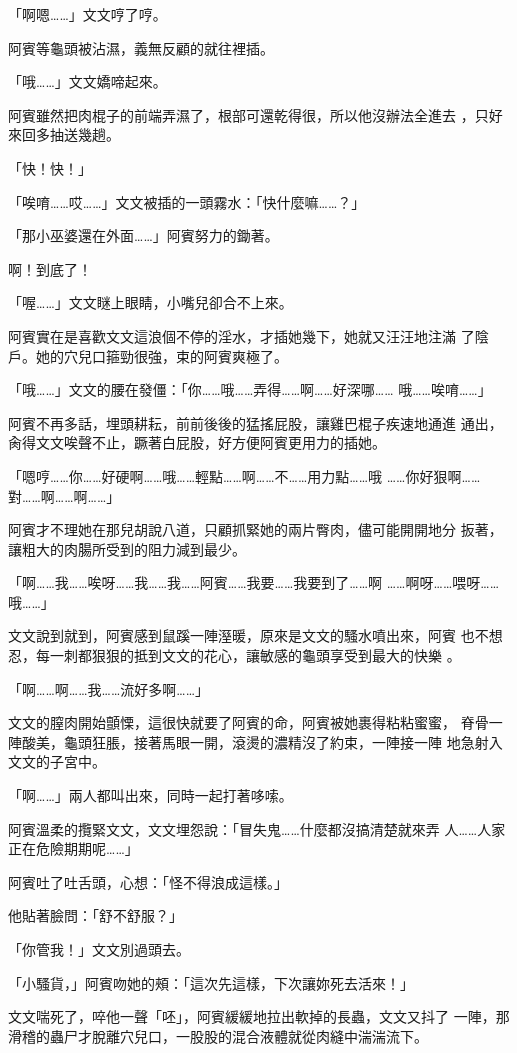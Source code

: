 「啊嗯……」文文哼了哼。

阿賓等龜頭被沾濕，義無反顧的就往裡插。

「哦……」文文嬌啼起來。

阿賓雖然把肉棍子的前端弄濕了，根部可還乾得很，所以他沒辦法全進去
，只好來回多抽送幾趟。

「快！快！」

「唉唷……哎……」文文被插的一頭霧水：「快什麼嘛……？」

「那小巫婆還在外面……」阿賓努力的鋤著。

啊！到底了！

「喔……」文文瞇上眼睛，小嘴兒卻合不上來。

阿賓實在是喜歡文文這浪個不停的淫水，才插她幾下，她就又汪汪地注滿
了陰戶。她的穴兒口箍勁很強，束的阿賓爽極了。

「哦……」文文的腰在發僵：「你……哦……弄得……啊……好深哪……
哦……唉唷……」

阿賓不再多話，埋頭耕耘，前前後後的猛搖屁股，讓雞巴棍子疾速地通進
通出，肏得文文唉聲不止，蹶著白屁股，好方便阿賓更用力的插她。

「嗯哼……你……好硬啊……哦……輕點……啊……不……用力點……哦
……你好狠啊……對……啊……啊……」

阿賓才不理她在那兒胡說八道，只顧抓緊她的兩片臀肉，儘可能開開地分
扳著，讓粗大的肉腸所受到的阻力減到最少。

「啊……我……唉呀……我……我……阿賓……我要……我要到了……啊
……啊呀……喂呀……哦……」

文文說到就到，阿賓感到鼠蹊一陣溼暖，原來是文文的騷水噴出來，阿賓
也不想忍，每一刺都狠狠的抵到文文的花心，讓敏感的龜頭享受到最大的快樂
。

「啊……啊……我……流好多啊……」

文文的膣肉開始顫慄，這很快就要了阿賓的命，阿賓被她裹得粘粘蜜蜜，
脊骨一陣酸美，龜頭狂脹，接著馬眼一開，滾燙的濃精沒了約束，一陣接一陣
地急射入文文的子宮中。

「啊……」兩人都叫出來，同時一起打著哆嗦。

阿賓溫柔的攬緊文文，文文埋怨說：「冒失鬼……什麼都沒搞清楚就來弄
人……人家正在危險期期呢……」

阿賓吐了吐舌頭，心想：「怪不得浪成這樣。」

他貼著臉問：「舒不舒服？」

「你管我！」文文別過頭去。

「小騷貨，」阿賓吻她的頰：「這次先這樣，下次讓妳死去活來！」

文文喘死了，啐他一聲「呸」，阿賓緩緩地拉出軟掉的長蟲，文文又抖了
一陣，那滑稽的蟲尸才脫離穴兒口，一股股的混合液體就從肉縫中湍湍流下。

